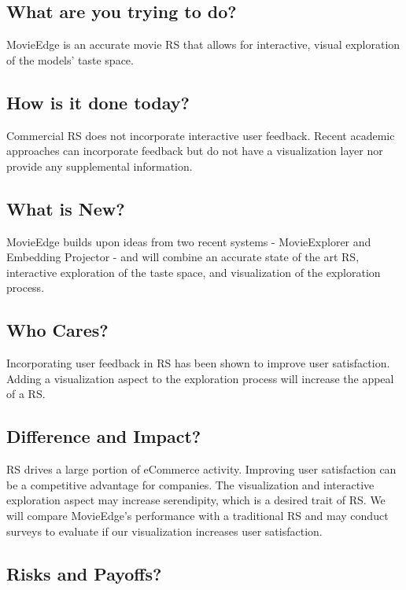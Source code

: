 \subsection{What are you trying to do?} 

MovieEdge is an accurate movie RS that allows for interactive, visual exploration of the models’ taste space. 

\subsection{How is it done today?}

Commercial RS does not incorporate interactive user feedback. Recent academic approaches can incorporate feedback but do not have a visualization layer nor provide any supplemental information.  

\subsection{What is New?}

MovieEdge builds upon ideas from two recent systems - MovieExplorer and Embedding Projector - and will combine an accurate state of the art RS, interactive exploration of the taste space, and visualization of the exploration process.  

\subsection{Who Cares?}

Incorporating user feedback in RS has been shown to improve user satisfaction. Adding a visualization aspect to the exploration process will increase the appeal of a RS. 

\subsection{Difference and Impact?}

RS drives a large portion of eCommerce activity. Improving user satisfaction can be a competitive advantage for companies. The visualization and interactive exploration aspect may increase serendipity, which is a desired trait of RS. We will compare MovieEdge's performance with a traditional RS and may conduct surveys to evaluate if our visualization increases user satisfaction. 

\subsection{Risks and Payoffs?}

